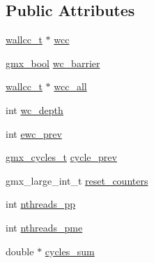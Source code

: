\subsection*{\-Public \-Attributes}
\begin{DoxyCompactItemize}
\item 
\hyperlink{structwallcc__t}{wallcc\-\_\-t} $\ast$ \hyperlink{structgmx__wallcycle_a151a634eb4691f96485dde73ef1b00e5}{wcc}
\item 
\hyperlink{include_2types_2simple_8h_a8fddad319f226e856400d190198d5151}{gmx\-\_\-bool} \hyperlink{structgmx__wallcycle_a6f32c65f7d80fddb42abff946833120e}{wc\-\_\-barrier}
\item 
\hyperlink{structwallcc__t}{wallcc\-\_\-t} $\ast$ \hyperlink{structgmx__wallcycle_a188c617723ddf101ce5da32314323b49}{wcc\-\_\-all}
\item 
int \hyperlink{structgmx__wallcycle_a53f1035aadc9d59b04803af8320df0fd}{wc\-\_\-depth}
\item 
int \hyperlink{structgmx__wallcycle_a6826992393f0fdad057554a0cafe2afa}{ewc\-\_\-prev}
\item 
\hyperlink{include_2gmx__cyclecounter_8h_a7b04e633389542df9f5535b05b873baa}{gmx\-\_\-cycles\-\_\-t} \hyperlink{structgmx__wallcycle_a245c960088fdfa38268cb6837cb73cd2}{cycle\-\_\-prev}
\item 
gmx\-\_\-large\-\_\-int\-\_\-t \hyperlink{structgmx__wallcycle_ac36e39b69c659b87e52d6b45c288d2fa}{reset\-\_\-counters}
\item 
int \hyperlink{structgmx__wallcycle_ab75abf89337d5fd6fa1f8cfd0db58cfc}{nthreads\-\_\-pp}
\item 
int \hyperlink{structgmx__wallcycle_a2092db27cdf27754c47915d37f302262}{nthreads\-\_\-pme}
\item 
double $\ast$ \hyperlink{structgmx__wallcycle_ad666774b3f470c59ec0adc68740bbb65}{cycles\-\_\-sum}
\end{DoxyCompactItemize}


